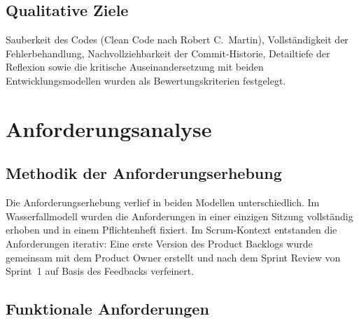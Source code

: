 \documentclass[12pt, a4paper, twoside]{report}
\begin{document}
\section{Qualitative Ziele}

\begin{infobox}
  Sauberkeit des Codes (Clean Code nach Robert C.\ Martin), Vollständigkeit der Fehlerbehandlung,
  Nachvollziehbarkeit der Commit-Historie, Detailtiefe der Reflexion sowie die kritische
  Auseinandersetzung mit beiden Entwicklungsmodellen wurden als Bewertungskriterien festgelegt.
\end{infobox}

\chapter{Anforderungsanalyse}
\label{chap:anforderungen}

\section{Methodik der Anforderungserhebung}

Die Anforderungserhebung verlief in beiden Modellen unterschiedlich. Im Wasserfallmodell
wurden die Anforderungen in einer einzigen Sitzung vollständig erhoben und in einem
Pflichtenheft fixiert. Im Scrum-Kontext entstanden die Anforderungen iterativ: Eine erste
Version des Product Backlogs wurde gemeinsam mit dem Product Owner erstellt und nach dem
Sprint Review von Sprint~1 auf Basis des Feedbacks verfeinert.

\section{Funktionale Anforderungen}
\end{document}
